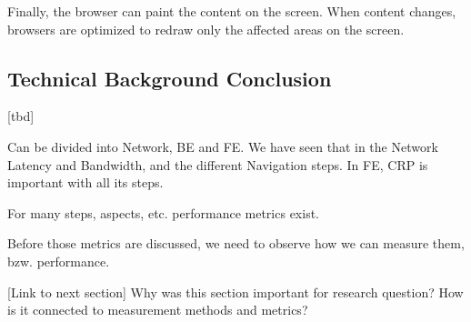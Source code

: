 Finally, the browser can paint the content on the screen.
When content changes, browsers are optimized to redraw only the affected areas on the screen. %













\subsection{Technical Background Conclusion}


[tbd]

Can be divided into Network, BE and FE.
We have seen that in the Network Latency and Bandwidth, and the different Navigation steps.
In FE, CRP is important with all its steps.

For many steps, aspects, etc. performance metrics exist.

Before those metrics are discussed, we need to observe how we can measure them, bzw. performance.

[Link to next section]
Why was this section important for research question?
How is it connected to measurement methods and metrics?





